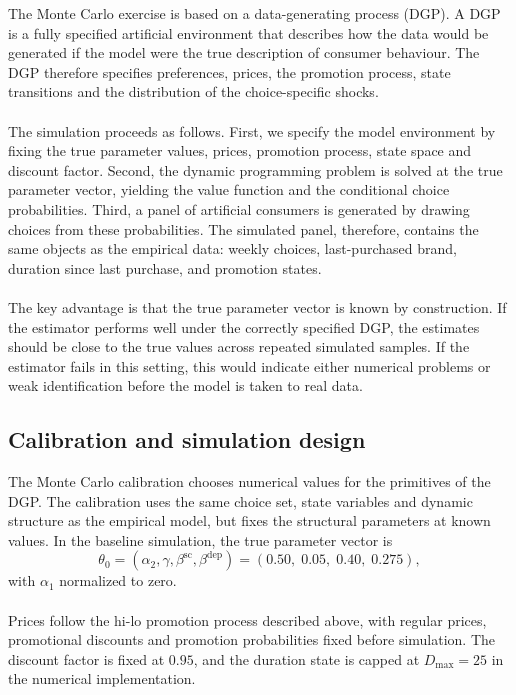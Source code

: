 The Monte Carlo exercise is based on a data-generating process (DGP). A DGP is a fully specified artificial environment that describes how the data would be generated if the model were the true description of consumer behaviour. The DGP therefore specifies preferences, prices, the promotion process, state transitions and the distribution of the choice-specific shocks.
\\
\\
The simulation proceeds as follows. First, we specify the model environment by fixing the true parameter values, prices, promotion process, state space and discount factor. Second, the dynamic programming problem is solved at the true parameter vector, yielding the value function and the conditional choice probabilities. Third, a panel of artificial consumers is generated by drawing choices from these probabilities. The simulated panel, therefore, contains the same objects as the empirical data: weekly choices, last-purchased brand, duration since last purchase, and promotion states.
\\
\\
The key advantage is that the true parameter vector is known by construction. If the estimator performs well under the correctly specified DGP, the estimates should be close to the true values across repeated simulated samples. If the estimator fails in this setting, this would indicate either numerical problems or weak identification before the model is taken to real data.

\subsection{Calibration and simulation design}

The Monte Carlo calibration chooses numerical values for the primitives of the DGP. The calibration uses the same choice set, state variables and dynamic structure as the empirical model, but fixes the structural parameters at known values. In the baseline simulation, the true parameter vector is
\[
\theta_0
=
\left(
\alpha_2,\gamma,\beta^{\text{sc}},\beta^{\text{dep}}
\right)
=
\left(
0.50,\;0.05,\;0.40,\;0.275
\right),
\]
with $\alpha_1$ normalized to zero.
\\
\\
Prices follow the hi-lo promotion process described above, with regular prices, promotional discounts and promotion probabilities fixed before simulation. The discount factor is fixed at $0.95$, and the duration state is capped at $D_{\max}=25$ in the numerical implementation.

